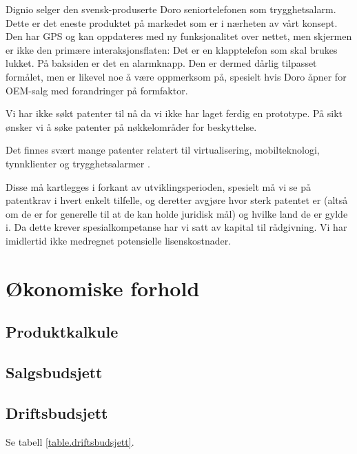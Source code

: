 
Dignio selger den svensk-produserte Doro seniortelefonen som trygghetsalarm.
Dette er det eneste produktet på markedet som er i nærheten av vårt konsept.
Den har GPS og kan oppdateres med ny funksjonalitet over nettet, men skjermen
er ikke den primære interaksjonsflaten: Det er en klapptelefon som skal brukes
lukket. På baksiden er det en alarmknapp.  Den er dermed dårlig tilpasset
formålet, men er likevel noe å være oppmerksom på, spesielt hvis Doro åpner for
OEM-salg med forandringer på formfaktor.

Vi har ikke søkt patenter til nå da vi ikke har laget ferdig en prototype. På
sikt ønsker vi å søke patenter på nøkkelområder for beskyttelse.

Det finnes svært mange patenter relatert til virtualisering, mobilteknologi,
tynnklienter og trygghetsalarmer \cite{patent.ricordi2008mobile,
patent.heinz2013wearable}.

Disse må kartlegges i forkant av utviklingsperioden, spesielt må vi se på
patentkrav i hvert enkelt tilfelle, og deretter avgjøre hvor sterk patentet er
(altså om de er for generelle til at de kan holde juridisk mål) og hvilke land
de er gylde i. Da dette krever spesialkompetanse har vi satt av kapital til
rådgivning. Vi har imidlertid ikke medregnet potensielle lisenskostnader.

\section{Økonomiske forhold}

\subsection{Produktkalkule}

\subsection{Salgsbudsjett}

\subsection{Driftsbudsjett}

Se tabell \vref{table.driftsbudsjett}.


